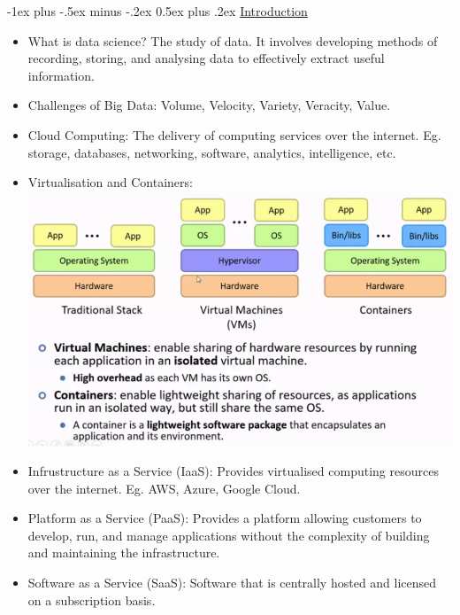 \documentclass[10pt, landscape]{article}
\makeatletter
\renewcommand{\section}{\@startsection{section}{1}{0mm}%
  {-1ex plus -.5ex minus -.2ex}%
  {0.5ex plus .2ex}%
{\normalfont\large\bfseries}}
\makeatother
\begin{document}
\raggedright
\footnotesize
\begin{multicols*}{4}
  \setlength{\columnseprule}{0.25pt}

  \begin{center}
  \end{center}


  \section{\underline{Introduction}}

  \begin{itemize}
    \item What is data science? The study of data. It involves developing methods of recording, storing, and analysing data to effectively extract useful information.
    \item Challenges of Big Data: Volume, Velocity, Variety, Veracity, Value.
    \item Cloud Computing: The delivery of computing services over the internet. Eg. storage, databases, networking, software, analytics, intelligence, etc.
    \item Virtualisation and Containers: \includegraphics[width=0.95\linewidth]{virtualisation_container.png}
    \item Infrustructure as a Service (IaaS): Provides virtualised computing resources over the internet. Eg. AWS, Azure, Google Cloud.
    \item Platform as a Service (PaaS): Provides a platform allowing customers to develop, run, and manage applications without the complexity of building and maintaining the infrastructure.
    \item Software as a Service (SaaS): Software that is centrally hosted and licensed on a subscription basis.
  \end{itemize}


\end{multicols*}
\end{document}
